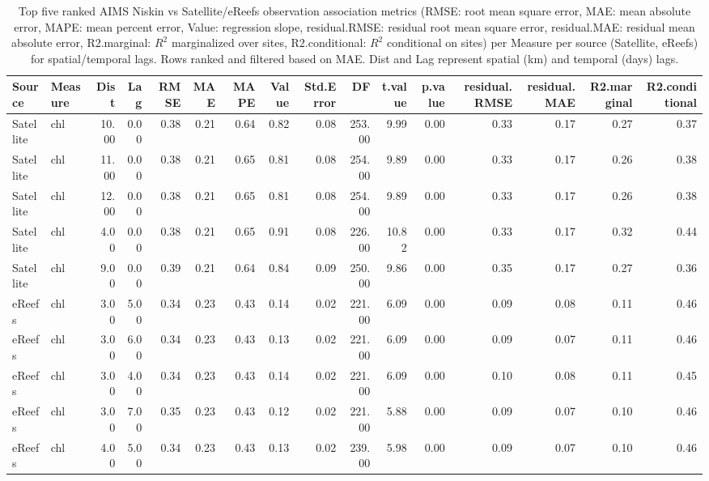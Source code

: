 \begin{table}[ht]
\centering
\caption[Top five ranked AIMS Niskin vs Satellite/eReefs observation association metrics (ordered by MAE)]{Top five ranked AIMS Niskin vs Satellite/eReefs observation association metrics (RMSE: root mean square error, MAE: mean absolute error, MAPE: mean percent error, Value: regression slope, residual.RMSE: residual root mean square error, residual.MAE: residual mean absolute error, R2.marginal: $R^2$ marginalized over sites, R2.conditional: $R^2$ conditional on sites) per Measure per source (Satellite, eReefs) for spatial/temporal lags.  Rows ranked and filtered based on MAE. Dist and Lag represent spatial (km) and temporal (days) lags.} 
\label{tab:comp.all.mae.sum.max}
\begingroup\scriptsize
\begin{tabular}{llrrrrrrrrrrrrrr}
  \toprule
Source & Measure & Dist & Lag & RMSE & MAE & MAPE & Value & Std.Error & DF & t.value & p.value & residual.RMSE & residual.MAE & R2.marginal & R2.conditional \\ 
  \midrule
Satellite & chl & 10.00 & 0.00 & 0.38 & 0.21 & 0.64 & 0.82 & 0.08 & 253.00 & 9.99 & 0.00 & 0.33 & 0.17 & 0.27 & 0.37 \\ 
  Satellite & chl & 11.00 & 0.00 & 0.38 & 0.21 & 0.65 & 0.81 & 0.08 & 254.00 & 9.89 & 0.00 & 0.33 & 0.17 & 0.26 & 0.38 \\ 
  Satellite & chl & 12.00 & 0.00 & 0.38 & 0.21 & 0.65 & 0.81 & 0.08 & 254.00 & 9.89 & 0.00 & 0.33 & 0.17 & 0.26 & 0.38 \\ 
  Satellite & chl & 4.00 & 0.00 & 0.38 & 0.21 & 0.65 & 0.91 & 0.08 & 226.00 & 10.82 & 0.00 & 0.33 & 0.17 & 0.32 & 0.44 \\ 
  Satellite & chl & 9.00 & 0.00 & 0.39 & 0.21 & 0.64 & 0.84 & 0.09 & 250.00 & 9.86 & 0.00 & 0.35 & 0.17 & 0.27 & 0.36 \\ 
  eReefs & chl & 3.00 & 5.00 & 0.34 & 0.23 & 0.43 & 0.14 & 0.02 & 221.00 & 6.09 & 0.00 & 0.09 & 0.08 & 0.11 & 0.46 \\ 
  eReefs & chl & 3.00 & 6.00 & 0.34 & 0.23 & 0.43 & 0.13 & 0.02 & 221.00 & 6.09 & 0.00 & 0.09 & 0.07 & 0.11 & 0.46 \\ 
  eReefs & chl & 3.00 & 4.00 & 0.34 & 0.23 & 0.43 & 0.14 & 0.02 & 221.00 & 6.09 & 0.00 & 0.10 & 0.08 & 0.11 & 0.45 \\ 
  eReefs & chl & 3.00 & 7.00 & 0.35 & 0.23 & 0.43 & 0.12 & 0.02 & 221.00 & 5.88 & 0.00 & 0.09 & 0.07 & 0.10 & 0.46 \\ 
  eReefs & chl & 4.00 & 5.00 & 0.34 & 0.23 & 0.43 & 0.13 & 0.02 & 239.00 & 5.98 & 0.00 & 0.09 & 0.07 & 0.10 & 0.46 \\ 

\end{tabular}
\end{table}
